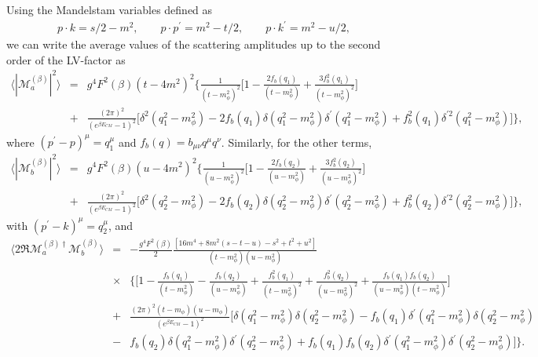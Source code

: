 \documentclass[11pt,showpacs,preprintnumbers,amsmath,amssymb,prd,nofootinbib,superscriptaddress]{revtex4-2}
\begin{document}
Using the Mandelstam variables defined as
\begin{eqnarray}
    p\cdot k=s/2-m^2,\quad\quad p\cdot p^\prime=m^2-t/2,\quad\quad p\cdot k^\prime=m^2-u/2,
\end{eqnarray}
we can write the average values of the scattering amplitudes up to the second order of the LV-factor as
\small{\begin{eqnarray}
\bigl\langle|\mathcal{M}^{(\beta)}_{a}|^2\bigr\rangle&=&g^4F^2(\beta)(t-4m^2)^2\biggl\{\frac{1}{(t-m_\phi^2)^2}\bigg[1-\frac{2f_b(q_1)}{(t-m_\phi^2)}+\frac{3f_b^2(q_1)}{(t-m_\phi^2)^2}\bigg]\nonumber\\
&+&\frac{(2\pi)^2}{(e^{\beta E_{CM}}-1)^2}\biggl[\delta^2(q_1^2-m_\phi^2)-2f_b(q_1)\delta(q_1^2-m_\phi^2)\delta^\prime(q_1^2-m_\phi^2)+f_b^2(q_1)\delta^{\prime2}(q_1^2-m_\phi^2)\biggr]\biggr\},\label{eqM11}
    \end{eqnarray}}
where $(p^\prime-p)^\mu=q_1^\mu$ and $f_b(q)=b_{\mu\nu}q^{\mu}q^{\nu}$. Similarly, for the other terms,
\begin{eqnarray}
    \bigl\langle|\mathcal{M}^{(\beta)}_{b}|^2\bigr\rangle&=&g^4F^2(\beta)(u-4m^2)^2\biggl\{\frac{1}{(u-m_\phi^2)^2}\bigg[1-\frac{2f_b(q_2)}{(u-m_\phi^2)}+\frac{3f_b^2(q_2)}{(u-m_\phi^2)^2}\bigg]\nonumber\\&+&\frac{(2\pi)^2}{(e^{\beta E_{CM}}-1)^2}\biggl[\delta^2(q_2^2-m_\phi^2)-2f_b(q_2)\delta(q_2^2-m_\phi^2)\delta^\prime(q_2^2-m_\phi^2)+f_b^2(q_2)\delta^{\prime2}(q_2^2-m_\phi^2)\biggr]\biggr\},\label{eqM12}
    \end{eqnarray}
with $(p^\prime-k)^\mu=q_2^\mu$, and
\begin{eqnarray}
    \bigl\langle2\Re{\mathcal{M}_{a}^{(\beta)\dagger}\mathcal{M}_{b}^{(\beta)}}\bigr\rangle&=&-\frac{g^4F^2(\beta)}{2}\frac{[16m^4+8m^2(s-t-u)-s^2+t^2+u^2]}{(t-m^2_{\phi})(u-m^2_{\phi})}\nonumber\\&\times&\biggl\{\bigg[1-\frac{f_b(q_1)}{(t-m_\phi^2)}-\frac{f_b(q_2)}{(u-m_\phi^2)}+\frac{f_b^2(q_1)}{(t-m_\phi^2)^2}+\frac{f^2_b(q_2)}{(u-m_\phi^2)^2}+\frac{f_b(q_1)f_b(q_2)}{(u-m_\phi^2)(t-m_\phi^2)}\bigg]\nonumber\\
    &+&\frac{(2\pi)^2(t-m_{\phi})(u-m_{\phi})}{(e^{\beta E_{CM}}-1)^2}\biggl[\delta(q_1^2-m_{\phi}^2)\delta(q_2^2-m_{\phi}^2)-f_b(q_1)\delta^\prime(q_1^2-m_{\phi}^2)\delta(q_2^2-m_{\phi}^2)\nonumber\\&-&f_b(q_2)\delta(q_1^2-m_{\phi}^2)\delta^\prime(q_2^2-m_{\phi}^2)+f_b(q_1)f_b(q_2)\delta^\prime(q_1^2-m_{\phi}^2)\delta^\prime(q_2^2-m_{\phi}^2)\biggr]\biggr\}.\label{eqM13}
\end{eqnarray}
\end{document}
